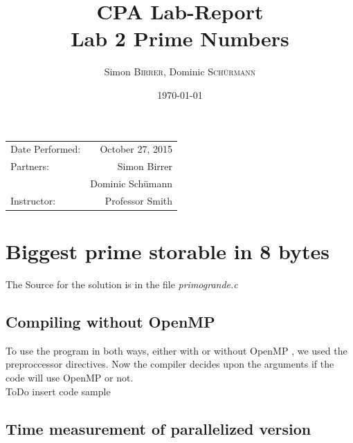 \documentclass[11pt,a4paper]{article}
\title{CPA Lab-Report \\ Lab 2 Prime Numbers} %
\author{Simon \textsc{Birrer}, Dominic \textsc{Sch\"urmann}} %
\date{\today} %
\begin{document}
\maketitle %

\begin{center}
\begin{tabular}{l r}
Date Performed: & October 27, 2015 \\ %
Partners: & Simon Birrer \\ %
& Dominic Sch\"umann \\
Instructor: & Professor Smith %
\end{tabular}
\end{center}

\bigskip

\tableofcontents

\pagebreak

\section{Biggest prime storable in 8 bytes}

The Source for the solution is in the file \textit{primo\textunderscore  grande.c} 

\subsection{Compiling without OpenMP}

To use the program in both ways, either with or without OpenMP , we used the preproccessor directives. Now the compiler decides upon the arguments if the code will use OpenMP or not.\\

ToDo insert code sample


\subsection{Time measurement of parallelized version}
\end{document}
